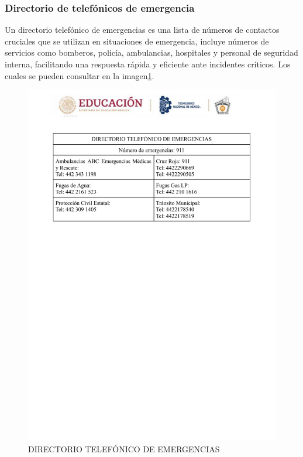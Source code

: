     \subsubsection{Directorio de telefónicos de emergencia}
    Un directorio telefónico de emergencias es una lista de números de contactos cruciales que se utilizan en situaciones de emergencia, incluye números de servicios como bomberos, policía, ambulancias, hospitales y personal de seguridad interna, facilitando una respuesta rápida y eficiente ante incidentes críticos. Los cuales se pueden consultar en la imagen\ref{DIRECTORIO TELEFONICO}.
    \begin{figure}
        \centering
    \includegraphics[trim = {0mm 180mm 0mm 0mm},clip,scale=0.3]{24/Img/directorioTelefonico.pdf}
    \caption{DIRECTORIO TELEFÓNICO DE EMERGENCIAS}
        \label{DIRECTORIO TELEFONICO}
    \end{figure}
